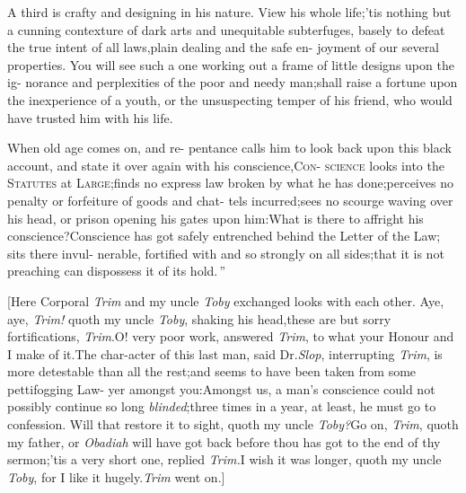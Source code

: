 \documentclass{article}
\begin{document}
\lqq A third is crafty and designing in\break
\lqq his nature. View his whole life;\tsk ’tis\break
\lqq nothing but a cunning contexture of\break
\lqq dark arts and unequitable subterfuges,\break
\lqq basely to defeat the true intent of all\break
\lqq laws,\tsh plain dealing and the safe en-\break
\lqq joyment of our several properties.\tsh{} 
\lqq You will see such a one working out\break
\lqq a frame of little designs upon the ig-\break
\lqq norance and perplexities of the poor\break
\lqq and needy man;\tsk shall raise a fortune\break
\lqq upon the inexperience of a youth, or\break
\lqq the unsuspecting temper of his friend,\break
\lqq who would have trusted him with his\break
\lqq life.

\lqq When old age comes on, and re-\break
\lqq pentance calls him to look back upon\break
\lqq this black account, and state it over\break
\lqq again with his conscience,\tsh \textsc{Con}-\break
\lqq \textsc{science} looks into the \textsc{Statutes} at\break
\lqq \textsc{Large};\tsk finds no express law broken\break
\lqq by what he has done;\tsk perceives no\break
\lqq penalty or forfeiture of goods and chat-\break
\lqq tels incurred;\tsk sees no scourge waving\break
\lqq over his head, or prison opening his\break
\lqq gates upon him:\tsk What is there to\break
\lqq affright his conscience?\tsk Conscience
\lqq has got safely entrenched behind the\break
\lqq Letter of the Law; sits there invul-\break
\lqq nerable, fortified with  and \break
\lqq {} so strongly on all sides;\tsk that\break
\lqq it is not preaching can dispossess it of\break
\lqq its hold.\,”

[Here Corporal \textit{Trim} and my uncle \textit{Toby} exchanged
looks with each other.\tsk\break
Aye, \tsk aye, \textit{Trim!} quoth my uncle \textit{Toby}, shaking
his head,\tsh these are but sorry fortifications,
\textit{Trim}.\tsh O! very poor work, answered \textit{Trim}, to
what your Honour and I make of it.\tsh The char-\break acter of this
last man, said Dr.\@ \textit{Slop}, interrupting \textit{Trim},
is more detestable than\break
all the rest;\tsh and seems to have\break
been taken from some pettifogging Law-\break
yer amongst you:\tsk Amongst us, a\break
man’s conscience could not possibly continue so long
\textit{blinded};\tsk three times in
a year, at least, he must go to confession. Will that restore it
to sight, quoth my uncle
\textit{Toby?}\tsk Go on, \textit{Trim}, quoth my father, or
\textit{Obadiah} will have got back before thou has got to the
end of thy\break
sermon;\tsh ’tis a very short one, replied
\textit{Trim.}\tsk I wish it was longer, quoth my uncle
\textit{Toby}, for I like it hugely.\tsk \textit{Trim} went on.]
\end{document}
